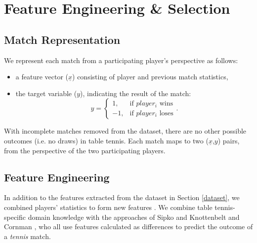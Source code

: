 \section{Feature Engineering \& Selection} \label{features}

\subsection{Match Representation}
We represent each match from a participating player's perspective as follows:
\begin{itemize}
    \item a feature vector ($\underline{x}$) consisting of player and previous match statistics,
    \item{
     the target variable ($y$), indicating the result of the match: %
     \begin{equation}
        y =
        \begin{cases}
        1, &\text{if $player_i$ wins} \\ 
        -1, &\text{if $player_i$ loses}
        \end{cases}.
    \end{equation}
     }
\end{itemize}



With incomplete matches removed from the dataset, there are no other possible outcomes (i.e. no draws) in table tennis. Each match maps to two ($\underline{x}$,$y$) pairs, from the perspective of the two participating players.

\subsection{Feature Engineering}
\label{sec:engineer}
In addition to the features extracted from the dataset in Section \ref{dataset}, we combined players' statistics to form new features \cite{barnett2005combining}. We combine table tennis-specific domain knowledge with the approaches of Sipko and Knottenbelt \cite{sipko2015machine} and Cornman \etal \cite{cornman2017machine}, who all use features calculated as differences to predict the outcome of a \textit{tennis} match.


